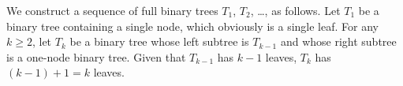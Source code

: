 We construct a sequence of full binary trees $T_1$, $T_2$, \dots, as follows.
Let $T_1$ be a binary tree containing a single node, which obviously is a single leaf.
For any $k\ge2$, let $T_k$ be a binary tree whose left subtree is $T_{k-1}$ and whose right subtree is a one-node binary tree.
Given that $T_{k-1}$ has $k-1$ leaves, $T_k$ has $(k-1)+1=k$ leaves.
